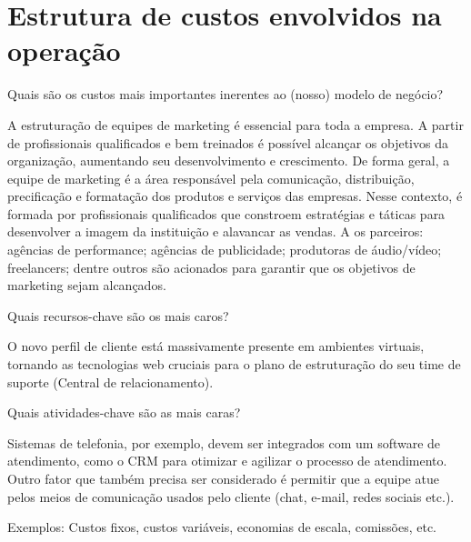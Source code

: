\section{\textbf{Estrutura de custos envolvidos na operação}}
\label{sec: Estrutura de custos envolvidos na operação}

\begin{commentA} \vspace{0.3cm} \noindent Quais são os custos mais importantes inerentes ao (nosso) modelo de negócio? \par \vspace{0.1cm} \end{commentA}


A estruturação de equipes de marketing é essencial para toda a empresa. A partir de profissionais qualificados e bem treinados é possível alcançar os objetivos da organização, aumentando seu desenvolvimento e crescimento. De forma geral, a equipe de marketing é a área responsável pela comunicação, distribuição, precificação e formatação dos produtos e serviços das empresas. Nesse contexto, é formada por profissionais qualificados que constroem estratégias e táticas para desenvolver a imagem da instituição e alavancar as vendas. A os parceiros: agências de performance; agências de publicidade; produtoras de áudio/vídeo; freelancers; dentre outros são acionados para garantir que os objetivos de marketing sejam alcançados.\par

\begin{commentA} \vspace{0.3cm} \noindent Quais recursos-chave são os mais caros? \par \vspace{0.1cm} \end{commentA}


O novo perfil de cliente está massivamente presente em ambientes virtuais, tornando as tecnologias web cruciais para o plano de estruturação do seu time de suporte (Central de relacionamento).\par

\begin{commentA} \vspace{0.3cm} \noindent Quais atividades-chave são as mais caras? \par \vspace{0.1cm} \end{commentA}


Sistemas de telefonia, por exemplo, devem ser integrados com um software de atendimento, como o CRM para otimizar e agilizar o processo de atendimento. Outro fator que também precisa ser considerado é permitir que a equipe atue pelos meios de comunicação usados pelo cliente (chat, e-mail, redes sociais etc.).\par

\begin{commentA} \vspace{0.3cm} \noindent Exemplos:
Custos fixos, custos variáveis, economias de escala, comissões, etc.
\par \vspace{0.1cm} \end{commentA}

